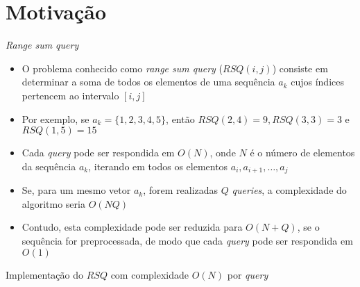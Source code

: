 \section{Motivação}

\begin{frame}[fragile]{\textit{Range sum query}}

    \begin{itemize}
        \item O problema conhecido como \textit{range sum query} ($RSQ(i, j)$) consiste em 
            determinar a 
            soma de todos os elementos de uma sequência $a_k$ cujos índices pertencem ao
            intervalo $[i, j]$

        \item Por exemplo, se $a_k = \lbrace 1, 2, 3, 4, 5\rbrace$, então $RSQ(2, 4) = 9,
            RSQ(3, 3) = 3$ e $RSQ(1, 5) = 15$

        \item Cada \textit{query} pode ser respondida em $O(N)$, onde $N$ é o número de elementos
            da sequência $a_k$, iterando em todos os elementos $a_i, a_{i + 1}, \ldots, a_j$

        \item Se, para um mesmo vetor $a_k$, forem realizadas $Q$ \textit{queries}, a complexidade
            do algoritmo seria $O(NQ)$

        \item Contudo, esta complexidade pode ser reduzida para $O(N + Q)$, se o sequência 
            for preprocessada, de modo que cada \textit{query} pode ser respondida em $O(1)$

    \end{itemize}

\end{frame}

\begin{frame}[fragile]{Implementação do $RSQ$ com complexidade $O(N)$ por \textit{query}}
\end{frame}

